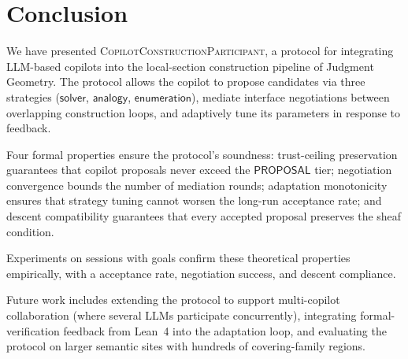 \documentclass[11pt]{article}
\newcommand{\CCP}{\textsc{CopilotConstructionParticipant}}
\begin{document}
\section{Conclusion}\label{sec:conc}

We have presented \CCP{}, a protocol for integrating LLM-based
copilots into the local-section construction pipeline of Judgment
Geometry.  The protocol allows the copilot to propose candidates via
three strategies ($\mathsf{solver}$, $\mathsf{analogy}$,
$\mathsf{enumeration}$), mediate interface negotiations between
overlapping construction loops, and adaptively tune its parameters
in response to feedback.

Four formal properties ensure the protocol's soundness:
trust-ceiling preservation guarantees that copilot proposals never
exceed the $\mathsf{PROPOSAL}$ tier; negotiation convergence bounds
the number of mediation rounds; adaptation monotonicity ensures that
strategy tuning cannot worsen the long-run acceptance rate; and
descent compatibility guarantees that every accepted proposal
preserves the sheaf condition.

Experiments on \ppLXXXVInumSessions{} sessions with
\ppLXXXVInumGoals{} goals confirm these theoretical properties
empirically, with a \ppLXXXVIacceptRate{} acceptance rate,
\ppLXXXVInegSuccessRate{} negotiation success, and
\ppLXXXVIdescentPassRate{} descent compliance.

Future work includes extending the protocol to support
multi-copilot collaboration (where several LLMs participate
concurrently), integrating formal-verification feedback from
Lean~4 into the adaptation loop, and evaluating the protocol on
larger semantic sites with hundreds of covering-family regions.
\end{document}

